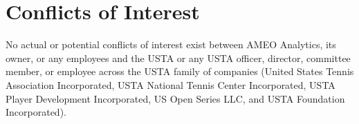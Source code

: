 
\section{Conflicts of Interest}

No actual or potential conflicts of interest exist between AMEO Analytics, its owner, or any employees and the USTA or any USTA officer, director, committee member, or employee across the USTA family of companies (United States Tennis Association Incorporated, USTA National Tennis Center Incorporated, USTA Player Development Incorporated, US Open Series LLC, and USTA Foundation Incorporated).